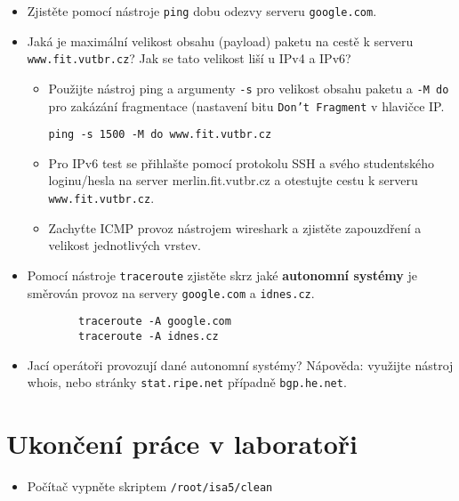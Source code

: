 \begin{itemize}
    \item Zjistěte pomocí nástroje \texttt{ping} dobu odezvy serveru \texttt{google.com}.
    \item Jaká je maximální velikost obsahu (payload) paketu na cestě k serveru \texttt{www.fit.vutbr.cz}? Jak se tato velikost liší u IPv4 a IPv6?
    \begin{itemize}
        \item Použijte nástroj ping a argumenty \texttt{-s} pro velikost obsahu paketu a \texttt{-M do} pro zakázání fragmentace (nastavení bitu \texttt{Don't Fragment} v hlavičce IP.
        \begin{verbatim}ping -s 1500 -M do www.fit.vutbr.cz
        \end{verbatim}
        \item Pro IPv6 test se přihlašte pomocí protokolu SSH a svého studentského loginu/hesla na server merlin.fit.vutbr.cz a otestujte cestu k serveru \texttt{www.fit.vutbr.cz}.
        \item Zachyťte ICMP provoz nástrojem wireshark a zjistěte zapouzdření a velikost jednotlivých vrstev.
    \end{itemize}
    \item Pomocí nástroje \texttt{traceroute} zjistěte skrz jaké \textbf{autonomní systémy} je směrován provoz na servery \texttt{google.com} a \texttt{idnes.cz}.
    \begin{verbatim}
        traceroute -A google.com
        traceroute -A idnes.cz
    \end{verbatim}
    \item Jací operátoři provozují dané autonomní systémy? Nápověda: využijte nástroj whois, nebo stránky \texttt{stat.ripe.net} případně \texttt{bgp.he.net}.
\end{itemize}

\section*{Ukončení práce v laboratoři}
\begin{itemize}
  \item Počítač vypněte skriptem {\tt /root/isa5/clean}
\end{itemize}
